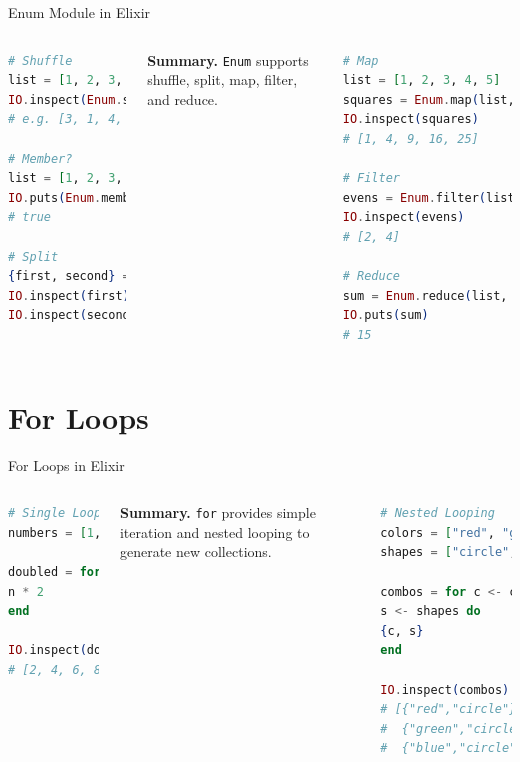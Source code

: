 \documentclass[aspectratio=169, table]{beamer}
\begin{document}
\begin{frame}[fragile]{Enum Module in Elixir}
\begin{columns}[t]
\begin{lstlisting}[language=Elixir, basicstyle=\ttfamily\scriptsize]
# Shuffle
list = [1, 2, 3, 4, 5]
IO.inspect(Enum.shuffle(list))
# e.g. [3, 1, 4, 5, 2]

# Member?
list = [1, 2, 3, 4, 5]
IO.puts(Enum.member?(list, 3))
# true

# Split
{first, second} = Enum.split(list, 2)
IO.inspect(first)   # [1, 2]
IO.inspect(second)  # [3, 4, 5]
\end{lstlisting}

\vspace{6pt}
\textbf{Summary.}  
\texttt{Enum} supports shuffle, split,  
map, filter, and reduce.


\begin{lstlisting}[language=Elixir, basicstyle=\ttfamily\scriptsize]
# Map
list = [1, 2, 3, 4, 5]
squares = Enum.map(list, fn x -> x * x end)
IO.inspect(squares)
# [1, 4, 9, 16, 25]

# Filter
evens = Enum.filter(list, fn x -> rem(x, 2) == 0 end)
IO.inspect(evens)
# [2, 4]

# Reduce
sum = Enum.reduce(list, 0, fn x, acc -> x + acc end)
IO.puts(sum)
# 15
\end{lstlisting}
\end{columns}
	

\end{frame}

\section{For Loops}

\begin{frame}[fragile]{For Loops in Elixir}
\begin{columns}[t]
\begin{lstlisting}[language=Elixir, basicstyle=\ttfamily\scriptsize]
# Single Looping
numbers = [1, 2, 3, 4, 5]

doubled = for n <- numbers do
n * 2
end

IO.inspect(doubled)
# [2, 4, 6, 8, 10]
\end{lstlisting}

\vspace{6pt}
\textbf{Summary.}  
\texttt{for} provides simple iteration and  
nested looping to generate new collections.


\begin{lstlisting}[language=Elixir, basicstyle=\ttfamily\scriptsize]
# Nested Looping
colors = ["red", "green", "blue"]
shapes = ["circle", "square"]

combos = for c <- colors,
s <- shapes do
{c, s}
end

IO.inspect(combos)
# [{"red","circle"}, {"red","square"},
#  {"green","circle"}, {"green","square"},
#  {"blue","circle"}, {"blue","square"}]
\end{lstlisting}
\end{columns}

\end{frame}
\end{document}
